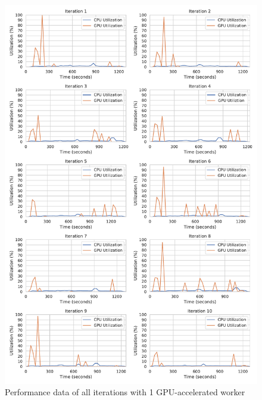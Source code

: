 \begin{figure}[h]
\centering
\includegraphics[scale=0.4]{images/07_evaluation/classification/gpu1_performance}
\caption{Performance data of all iterations with 1 GPU-accelerated worker}
\label{fig:appendix_eval_classification_gpu1}
\end{figure}

